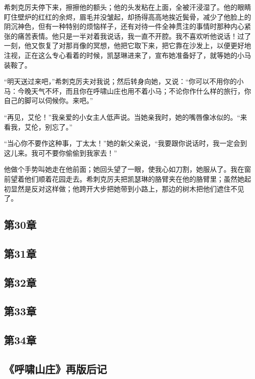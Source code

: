 \par 希刺克厉夫停下来，擦擦他的额头；他的头发粘在上面，全被汗浸湿了。他的眼睛盯住壁炉的红红的余烬，眉毛并没皱起，却扬得高高地挨近鬓骨，减少了他脸上的阴沉神色，但有一种特别的烦恼样子，还有对待一件全神贯注的事情时那种内心紧张的痛苦表情。他只是一半对着我说话，我一直不开腔。我不喜欢听他说话！过了一刻，他又恢复了对那肖像的冥想，他把它取下来，把它靠在沙发上，以便更好地注视，正在这么专心看着的时候，凯瑟琳进来了，宣布她准备好了，就等她的小马装鞍了。
\par “明天送过来吧，”希刺克厉夫对我说；然后转身向她，又说：“你可以不用你的小马：今晚天气不坏，而且你在呼啸山庄也用不着小马；不论你作什么样的旅行，你自己的脚可以伺候你。来吧。”
\par “再见，艾伦！”我亲爱的小女主人低声说。当她亲我时，她的嘴唇像冰似的。“来看我，艾伦，别忘了。”
\par “当心你不要作这种事，丁太太！”她的新父亲说，“我要跟你说话时，我一定会到这儿来。我可不要你偷偷到我家去！”
\par 他做个手势叫她走在他前面；她回头望了一眼，使我心如刀割，她服从了。我在窗前望着他们顺着花园走去。希刺克厉夫把凯瑟琳的胳臂夹在他的胳臂里；虽然她起初显然是反对这样做；他跨开大步把她带到小路上，那边的树木把他们遮住不见了。


\subsection{第30章}




\subsection{第31章}




\subsection{第32章}




\subsection{第33章}




\subsection{第34章}




\subsection{《呼啸山庄》再版后记}













